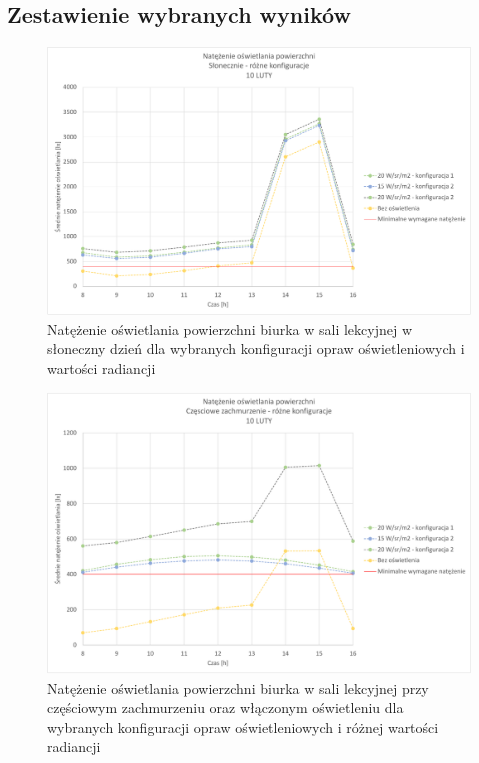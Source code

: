 \documentclass[a4paper,12pt]{article}
\begin{document}
	\subsection{Zestawienie wybranych wyników}
	\label{sec:zestawienie_wybranych_wynikow}
	
	\begin{figure}[!ht]
		\centering
		\includegraphics[width=\linewidth]{Wykresy/oswietlenie_slonecznie_rozne_konfiguracje.pdf}
		\caption{Natężenie oświetlania powierzchni biurka w sali lekcyjnej w słoneczny dzień dla wybranych konfiguracji opraw oświetleniowych i wartości radiancji}
		\label{oswietlenie_slonecznie_rozne_konfiguracje}
	\end{figure}

	\begin{figure}[!ht]
		\centering
		\includegraphics[width=\linewidth]{Wykresy/oswietlenie_czesciowe_zachmurzenie_rozne_konfiguracje.pdf}
		\caption{Natężenie oświetlania powierzchni biurka w sali lekcyjnej przy częściowym zachmurzeniu  oraz włączonym oświetleniu dla wybranych konfiguracji opraw oświetleniowych i różnej wartości radiancji}
		\label{oswietlenie_czesciowe_zachmurzenie_rozne_konfiguracje}
	\end{figure}
\end{document}
